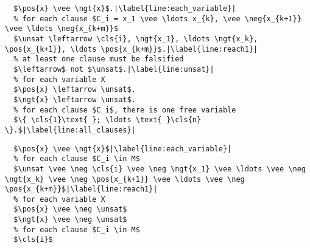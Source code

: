 \begin{figure*}
\begin{lstlisting}[caption={Program $\program{F}$},label={code:as_to_uc},captionpos=b,mathescape=true,escapechar=|,xleftmargin=0.5cm]
  % for each variable $x \in X$
  $\pos{x} \vee \ngt{x}$.|\label{line:each_variable}|
  % for each clause $C_i = x_1 \vee \ldots x_{k}, \vee \neg{x_{k+1}} \vee \ldots \neg{x_{k+m}}$
  $\unsat \leftarrow \cls{i}, \ngt{x_1}, \ldots \ngt{x_k}, \pos{x_{k+1}}, \ldots \pos{x_{k+m}}$.|\label{line:reach1}|
  % at least one clause must be falsified
  $\leftarrow$ not $\unsat$.|\label{line:unsat}|
  % for each variable X
  $\pos{x} \leftarrow \unsat$.
  $\ngt{x} \leftarrow \unsat$.
  % for each clause $C_i$, there is one free variable
  $\{ \cls{1}\text{ }; \ldots \text{ }\cls{n} \}.$|\label{line:all_clauses}|
\end{lstlisting}
\begin{lstlisting}[caption={Reduct of $\program{F}$ w.r.t. $M$},label={code:program_to_reduct},captionpos=b,mathescape=true,escapechar=|,xleftmargin=0.5cm]
  % for each variable $x \in X$
  $\pos{x} \vee \ngt{x}$|\label{line:each_variable}|
  % for each clause $C_i \in M$
  $\unsat \vee \neg \cls{i} \vee \neg \ngt{x_1} \vee \ldots \vee \neg \ngt{x_k} \vee \neg \pos{x_{k+1}} \vee \ldots \vee \neg \pos{x_{k+m}}$|\label{line:reach1}|
  % for each variable X
  $\pos{x} \vee \neg \unsat$
  $\ngt{x} \vee \neg \unsat$
  % for each clause $C_i \in M$
  $\cls{i}$
\end{lstlisting}
\end{figure*}

